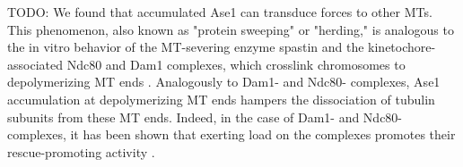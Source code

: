 
TODO: We found that accumulated Ase1 can transduce forces to other MTs. This phenomenon, also known as "protein sweeping" or "herding," is analogous to the in vitro behavior of the MT-severing enzyme spastin and the kinetochore-associated Ndc80 and Dam1 complexes, which crosslink chromosomes to depolymerizing MT ends \parencite{Franck2007, umbreit2012ndc80, grishchuk2017biophysics}. Analogously to Dam1- and Ndc80- complexes, Ase1 accumulation at depolymerizing MT ends hampers the dissociation of tubulin subunits from these MT ends. Indeed, in the case of Dam1- and Ndc80- complexes, it has been shown that exerting load on the complexes promotes their rescue-promoting activity \parencite{Franck2007, volkov2018multivalency}. \par

